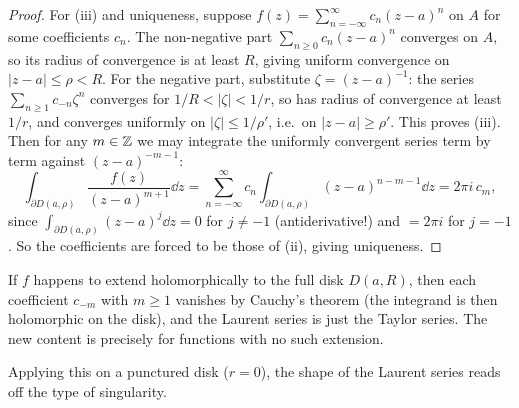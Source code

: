 \documentclass[a4paper]{scrartcl}
\begin{document}
\begin{proof}
    For (iii) and uniqueness, suppose $f(z) = \sum_{n = -\infty}^{\infty} c_n (z - a)^n$ on $A$ for some coefficients $c_n$. The non-negative part $\sum_{n \geq 0} c_n(z - a)^n$ converges on $A$, so its radius of convergence is at least $R$, giving uniform convergence on $|z - a| \leq \rho < R$. For the negative part, substitute $\zeta = (z - a)^{-1}$: the series $\sum_{n \geq 1} c_{-n} \zeta^n$ converges for $1/R < |\zeta| < 1/r$, so has radius of convergence at least $1/r$, and converges uniformly on $|\zeta| \leq 1/\rho'$, i.e.\ on $|z - a| \geq \rho'$. This proves (iii). Then for any $m \in \mathbb{Z}$ we may integrate the uniformly convergent series term by term against $(z - a)^{-m-1}$:
    $$
    \int_{\partial D(a, \rho)} \frac{f(z)}{(z - a)^{m + 1}} \dd z = \sum_{n = -\infty}^{\infty} c_n \int_{\partial D(a, \rho)} (z - a)^{n - m - 1} \dd z = 2 \pi i \, c_m,
    $$
    since $\int_{\partial D(a, \rho)}(z - a)^{j} \dd z = 0$ for $j \neq -1$ (antiderivative!) and $= 2\pi i$ for $j = -1$. So the coefficients are forced to be those of (ii), giving uniqueness.
\end{proof}

\begin{remark}
    If $f$ happens to extend holomorphically to the full disk $D(a, R)$, then each coefficient $c_{-m}$ with $m \geq 1$ vanishes by Cauchy's theorem (the integrand is then holomorphic on the disk), and the Laurent series is just the Taylor series. The new content is precisely for functions with no such extension.
\end{remark}

Applying this on a punctured disk ($r = 0$), the shape of the Laurent series reads off the type of singularity.
\end{document}
